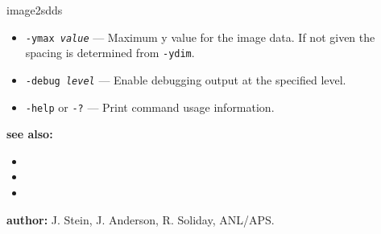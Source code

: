 \begin{sddsprog}{image2sdds}
\begin{itemize}
    \item {\tt -ymax {\em value}} --- Maximum y value for the image data. If not given
      the spacing is determined from {\tt -ydim}.
    \item {\tt -debug {\em level}} --- Enable debugging output at the specified level.
    \item {\tt -help} or {\tt -?} --- Print command usage information.
    \end{itemize}
  \item \textbf{see also:}
    \begin{itemize}
    \item {}
    \item {}
    \item {}
    \end{itemize}
  \item \textbf{author:} J. Stein, J. Anderson, R. Soliday, ANL/APS.
\end{sddsprog}

